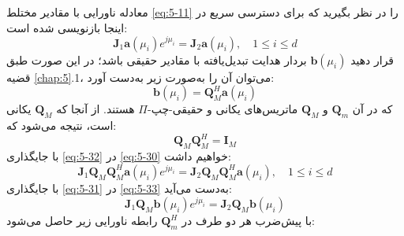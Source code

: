 معادله ناورایی با مقادیر مختلط \eqref{eq:5-11} را در نظر بگیرید که برای دسترسی سریع در اینجا بازنویسی شده است:
\begin{equation}
	\bm{J}_1 \bm{a}(\mu_i) e^{j\mu_i} = \bm{J}_2 \bm{a}(\mu_i), \quad 1 \leq i \leq d
	\label{eq:5-30}
\end{equation}
قرار دهید $\bm{b}(\mu_i)$ بردار هدایت تبدیل‌یافته با مقادیر حقیقی باشد؛ در این صورت طبق قضیه \ref{chap:5}.1، می‌توان آن را به‌صورت زیر به‌دست آورد:
\begin{equation}
	\bm{b}(\mu_i) = \bm{Q}_M^H \bm{a}(\mu_i)
	\label{eq:5-31}
\end{equation}
که در آن $\bm{Q}_m$ و $\bm{Q}_M$ ماتریس‌های یکانی و حقیقی-چپ-$\Pi$ هستند. از آنجا که $\bm{Q}_M$ یکانی است، نتیجه می‌شود که:
\begin{equation}
	\bm{Q}_M \bm{Q}_M^H = \bm{I}_M
	\label{eq:5-32}
\end{equation}
با جایگذاری \eqref{eq:5-32} در \eqref{eq:5-30} خواهیم داشت:
\begin{equation}
	\bm{J}_1 \bm{Q}_M \bm{Q}_M^H \bm{a}(\mu_i) e^{j\mu_i} = \bm{J}_2 \bm{Q}_M \bm{Q}_M^H \bm{a}(\mu_i), \quad 1 \leq i \leq d
	\label{eq:5-33}
\end{equation}
با جایگذاری \eqref{eq:5-31} در \eqref{eq:5-33} به‌دست می‌آید:
\begin{equation}
	\bm{J}_1 \bm{Q}_M \bm{b}(\mu_i) e^{j\mu_i} = \bm{J}_2 \bm{Q}_M \bm{b}(\mu_i)
	\label{eq:5-34}
\end{equation}
با پیش‌ضرب هر دو طرف در $\bm{Q}_m^H$ رابطه ناورایی زیر حاصل می‌شود:

